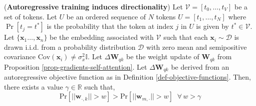 \begin{theorem}
\label{theo-gradient-directionality}
%
(\textbf{Autoregressive training induces directionality})
%
Let $\mathcal{V} = [t_0, \dots, t_V]$ be a set of tokens.
%
Let $U$ be an ordered sequence of $N$ tokens $U = [t_1, \dots, t_N]$ where $\Pr[t_j = t^*]$ is the probability that the token at index $j$ in $U$ is given by $t^* \in \mathcal{V}$.
%
Let $\{\bm{x}_1 \dots, \bm{x}_n\}$ be the embedding associated with $\mathcal{V}$ such that each $\bm{x}_i \sim \mathcal{D}$ is drawn i.i.d. from a probability distribution $\mathcal{D}$ with zero mean and semipositive covariance $\text{Cov}(\bm{x}_i)  \neq \sigma_x^2\mathbb{I}$.
%
Let $\Delta \bm{W}_{qk}$ be the weight update of $\bm{W}_{qk}$ from Proposition \ref{prop-gradients-self-attention}.
%
Let $\Delta \bm{W}_{qk}$ be derived from an autoregressive objective function as in Definition \ref{def-objective-functions}.
%
Then, there exists a value $\gamma \in \mathbb{R}$ such that,
%
\begin{equation}
    \text{Pr}[||\bm{w}_{\cdot, k}|| > w] > \text{Pr}[|| \bm{w}_{m, \cdot}|| > w] \,\,\ \forall \,w > \gamma
\end{equation}
%
\end{theorem}